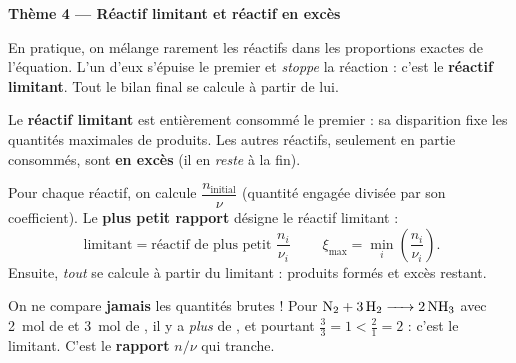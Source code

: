 \documentclass[11pt,a4paper]{article}
\begin{document}

\begin{center}
{\Large\bfseries\color{primarydark} Thème 4 — Réactif limitant et réactif en excès}
\end{center}

\medskip
En pratique, on mélange rarement les réactifs dans les proportions exactes de l'équation. L'un d'eux
s'épuise le premier et \emph{stoppe} la réaction : c'est le \textbf{réactif limitant}. Tout le bilan
final se calcule à partir de lui.

\begin{cle}
Le \textbf{réactif limitant} est entièrement consommé le premier : sa disparition fixe les quantités
maximales de produits. Les autres réactifs, seulement en partie consommés, sont \textbf{en excès}
(il en \emph{reste} à la fin).
\end{cle}

\begin{methode}
Pour chaque réactif, on calcule $\dfrac{n_{\text{initial}}}{\nu}$ (quantité engagée divisée par son
coefficient). Le \textbf{plus petit rapport} désigne le réactif limitant :
\[
\boxed{\;\text{limitant}=\text{réactif de plus petit }\dfrac{n_i}{\nu_i}\;}
\qquad
\xi_{\max}=\min_i\!\left(\dfrac{n_i}{\nu_i}\right).
\]
Ensuite, \emph{tout} se calcule à partir du limitant : produits formés et excès restant.
\end{methode}

\begin{piege}
On ne compare \textbf{jamais} les quantités brutes ! Pour $\ce{N2 + 3 H2 -> 2 NH3}$ avec
\qty{2}{\mole} de  et \qty{3}{\mole} de , il y a \emph{plus} de , et pourtant
$\frac{3}{3}=1<\frac{2}{1}=2$ : c'est  le limitant. C'est le \textbf{rapport} $n/\nu$ qui tranche.
\end{piege}
\end{document}
